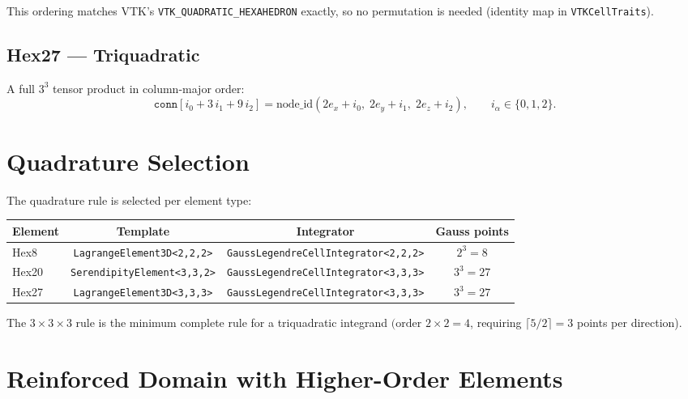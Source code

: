 \noindent This ordering matches VTK's
\texttt{VTK\_QUADRATIC\_HEXAHEDRON} exactly, so no permutation is
needed (identity map in \texttt{VTKCellTraits}).

\subsection{Hex27 — Triquadratic}

A full $3^3$ tensor product in column-major order:
%
\begin{equation}
  \texttt{conn}[i_0 + 3\,i_1 + 9\,i_2]
  = \text{node\_id}(2e_x + i_0,\; 2e_y + i_1,\; 2e_z + i_2),
  \qquad i_\alpha \in \{0,1,2\}.
\end{equation}


\section{Quadrature Selection}
\label{sec:ho-quadrature}

The quadrature rule is selected per element type:

\begin{center}
\begin{tabular}{lccc}
  \toprule
  Element & Template & Integrator & Gauss points \\
  \midrule
  Hex8  & \texttt{LagrangeElement3D<2,2,2>}
        & \texttt{GaussLegendreCellIntegrator<2,2,2>} & $2^3 = 8$ \\
  Hex20 & \texttt{SerendipityElement<3,3,2>}
        & \texttt{GaussLegendreCellIntegrator<3,3,3>} & $3^3 = 27$ \\
  Hex27 & \texttt{LagrangeElement3D<3,3,3>}
        & \texttt{GaussLegendreCellIntegrator<3,3,3>} & $3^3 = 27$ \\
  \bottomrule
\end{tabular}
\end{center}

The $3 \times 3 \times 3$ rule is the minimum complete rule for a
triquadratic integrand $(\text{order } 2 \times 2 = 4$,
requiring $\lceil 5/2 \rceil = 3$ points per direction).


\section{Reinforced Domain with Higher-Order Elements}
\label{sec:ho-reinforced}

